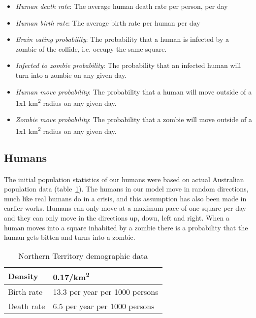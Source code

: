 \documentclass{report}
\begin{document}
\begin{itemize}
\item \emph{Human death rate}: The average human death rate per person, per day
\item \emph{Human birth rate}: The average birth rate per human per day
\item \emph{Brain eating probability}: The probability that a human is infected by a zombie of the collide, i.e. occupy the same square.
\item \emph{Infected to zombie probability}: The probability that an infected human will turn into a zombie on any given day.
\item \emph{Human move probability}: The probability that a human will move outside of a 1x1 km\textsuperscript{2} radius on any given day.
\item \emph{Zombie move probability}: The probability that a zombie will move outside of a 1x1 km\textsuperscript{2} radius on any given day.
\end{itemize}

\subsection{Humans}
\paragraph{}
The initial population statistics of our humans were based on actual Australian population data (table~\ref{AustralianData}). The humans in our model move in random directions, much like real humans do in a crisis, and this assumption has also been made in earlier works\cite{munz}. Humans can only move at a maximum pace of one square per day and they can only move in the directions up, down, left and right. When a human moves into a square inhabited by a zombie there is a probability that the human gets bitten and turns into a zombie.
\begin{table}[!h]
    \begin{tabular}{|l|l|}
      \hline
        Density    & 0.17/km\textsuperscript{2} \\
      \hline
        Birth rate & 13.3 per year per 1000 persons \\
      \hline
        Death rate & 6.5 per year per 1000 persons \\
      \hline
\end{tabular}
\caption{Northern Territory demographic data}\label{AustralianData}
\end{table}
\end{document}
